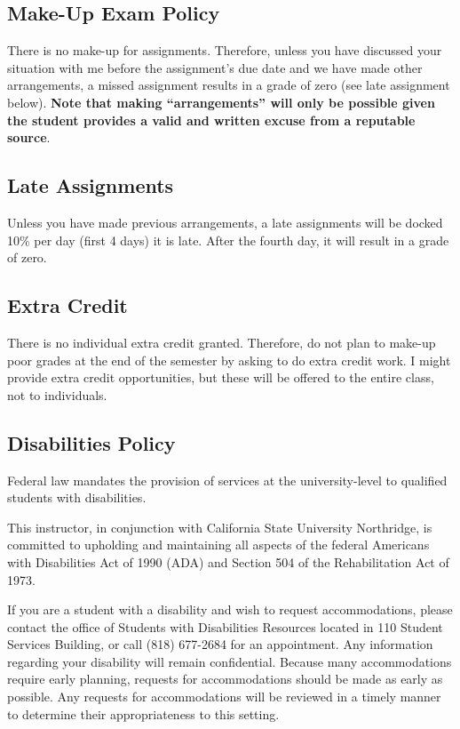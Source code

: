 \documentclass[11pt,]{article}
\begin{document}
\hypertarget{make-up-exam-policy}{%
\subsection{Make-Up Exam Policy}\label{make-up-exam-policy}}

There is no make-up for assignments. Therefore, unless you have
discussed your situation with me before the assignment's due date and we
have made other arrangements, a missed assignment results in a grade of
zero (see late assignment below). \textbf{Note that making
``arrangements'' will only be possible given the student provides a
valid and written excuse from a reputable source}.

\hypertarget{late-assignments}{%
\subsection{Late Assignments}\label{late-assignments}}

Unless you have made previous arrangements, a late assignments will be
docked 10\% per day (first 4 days) it is late. After the fourth day, it
will result in a grade of zero.

\hypertarget{extra-credit}{%
\subsection{Extra Credit}\label{extra-credit}}

There is no individual extra credit granted. Therefore, do not plan to
make-up poor grades at the end of the semester by asking to do extra
credit work. I might provide extra credit opportunities, but these will
be offered to the entire class, not to individuals.

\hypertarget{disabilities-policy}{%
\subsection{Disabilities Policy}\label{disabilities-policy}}

Federal law mandates the provision of services at the university-level
to qualified students with disabilities.

This instructor, in conjunction with California State University
Northridge, is committed to upholding and maintaining all aspects of the
federal Americans with Disabilities Act of 1990 (ADA) and Section 504 of
the Rehabilitation Act of 1973.

If you are a student with a disability and wish to request
accommodations, please contact the office of Students with Disabilities
Resources located in 110 Student Services Building, or call (818)
677-2684 for an appointment. Any information regarding your disability
will remain confidential. Because many accommodations require early
planning, requests for accommodations should be made as early as
possible. Any requests for accommodations will be reviewed in a timely
manner to determine their appropriateness to this setting.
\end{document}
